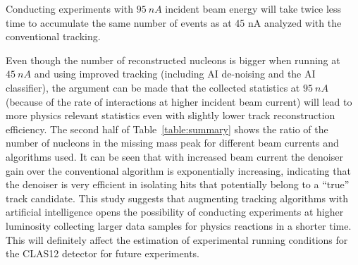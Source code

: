 Conducting experiments with $95~nA$ incident beam energy will take twice less time to accumulate the same number 
of events as at 45 nA analyzed with the conventional tracking.

Even though the number of reconstructed nucleons is bigger when running at $45~nA$ and using improved 
tracking (including AI de-noising and the AI classifier), the argument can be made that the collected statistics at 
$95~nA$ (because of the rate of interactions at higher incident beam current) will lead to more physics relevant
statistics even with slightly lower track reconstruction efficiency.
The second half of Table~\ref{table:summary} shows the ratio of the number of nucleons in the 
missing mass peak for different beam currents and algorithms used. It can be seen that with increased 
beam current the denoiser gain over the conventional algorithm is exponentially increasing, indicating that 
the denoiser is very efficient in isolating hits that potentially belong to a ``true'' track candidate.
This study suggests that augmenting tracking algorithms with artificial intelligence opens the possibility
of conducting experiments at higher luminosity collecting larger data samples for physics reactions in 
a shorter time. This will definitely affect the estimation of experimental running conditions for the CLAS12 
detector for future experiments.
